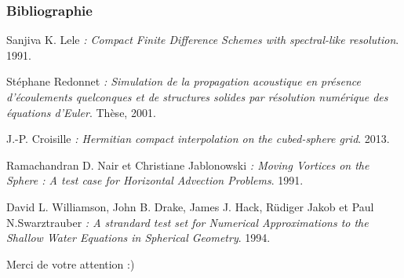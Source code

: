 \documentclass[11pt]{beamer}
\begin{document}
\begin{frame}
\frametitle{Bibliographie}

\begin{thebibliography}{9}
        

\scriptsize{

         Sanjiva K. Lele
         \emph{: Compact Finite Difference Schemes with spectral-like resolution}.
         1991.
         
         Stéphane Redonnet
         \emph{: Simulation de la propagation acoustique en présence d'écoulements quelconques et de structures solides par résolution numérique des équations d'Euler}.
         Thèse, 2001.

         J.-P. Croisille
         \emph{: Hermitian compact interpolation on the cubed-sphere grid}.
         2013.

         Ramachandran D. Nair et Christiane Jablonowski
         \emph{: Moving Vortices on the Sphere : A test case for Horizontal Advection Problems}.
         1991.

         
         David L. Williamson, John B. Drake, James J. Hack, Rüdiger Jakob et Paul N.Swarztrauber
         \emph{: A strandard test set for Numerical Approximations to the Shallow Water Equations in Spherical Geometry}.
         1994.
    
    }     
         
         
         
\end{thebibliography}
\end{frame}

\begin{frame}
\begin{center}
Merci de votre attention :)
\end{center}
\end{frame}
\end{document}
